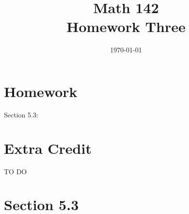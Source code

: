\documentclass{exam}
\author{}
\date{\today}
\title{Math 142 \\ Homework Three}
\begin{document}
  \maketitle

  \section{Homework}
  Section 5.3: 

  \section{Extra Credit}
  TO DO

  \ifprintanswers
    \section{Section 5.3}
\end{document}
